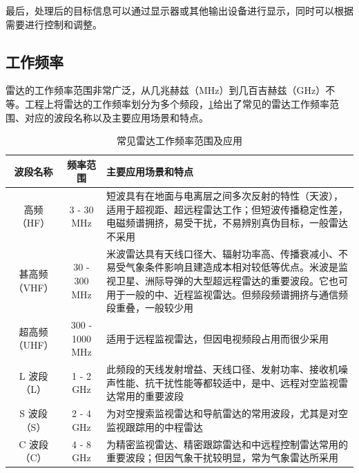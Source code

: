 最后，处理后的目标信息可以通过显示器或其他输出设备进行显示，同时可以根据需要进行控制和调整。



\subsection{工作频率}

雷达的工作频率范围非常广泛，从几兆赫兹（MHz）到几百吉赫兹（GHz）不等。工程上将雷达的工作频率划分为多个频段，\cref{tab_chp1_radar_frequency}给出了常见的雷达工作频率范围、对应的波段名称以及主要应用场景和特点。

\begin{table}[htb!]
    \centering
    \caption{常见雷达工作频率范围及应用}
    \label{tab_chp1_radar_frequency}
    \small
    \begin{tabular}{c|c|p{7cm}}
        \hline
        波段名称      & 频率范围           & 主要应用场景和特点                                                                                                     \\
        \hline
        \hline
        高频（HF）    & 3 - 30 MHz     & 短波具有在地面与电离层之间多次反射的特性（天波），适用于超视距、超远程雷达工作；但短波传播稳定性差，电磁频谱拥挤，易受干扰，不易辨别真伪目标，一般雷达不采用
        \\
        \hline
        甚高频（VHF）  & 30 - 300 MHz   & 米波雷达具有天线口径大、辐射功率高、传播衰减小、不易受气象条件影响且建造成本相对较低等优点。米波是监视卫星、洲际导弹的大型超远程雷达的重要波段。它也可用于一般的中、近程监视雷达。但频段频谱拥挤与通信频段重叠，一般较少用 \\
        \hline
        超高频（UHF）  & 300 - 1000 MHz & 适用于远程监视雷达，但因电视频段占用而很少采用                                                                                       \\
        \hline
        L 波段（L）   & 1 - 2 GHz      & 此频段的天线发射增益、天线口径、发射功率、接收机噪声性能、抗干扰性能等都较适中，是中、远程对空监视雷达常用的重要波段                                                    \\
        \hline
        S 波段（S）   & 2 - 4 GHz      & 为对空搜索监视雷达和导航雷达的常用波段，尤其是对空监视跟踪用的中程雷达                                                                           \\
        \hline
        C 波段（C）   & 4 - 8 GHz      & 为精密监视雷达、精密跟踪雷达和中远程控制雷达常用的重要波段；但因气象干扰较明显，常为气象雷达所采用                                                             \\

\end{tabular}
\end{table}
